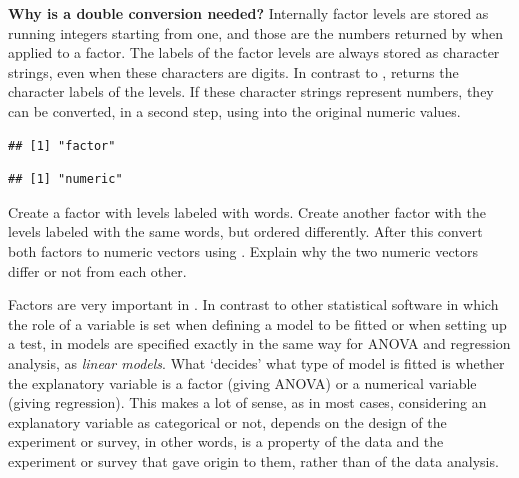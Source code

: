 \documentclass[krantz2]{krantz}\usepackage{knitr}%
\begin{document}
\begin{explainbox}
\textbf{Why is a double conversion needed?} Internally factor levels are stored as running integers starting from one, and those are the numbers returned by  when applied to a factor. The labels of the factor levels are always stored as character strings, even when these characters are digits. In contrast to ,  returns the character labels of the levels. If these character strings represent numbers, they can be converted, in a second step, using  into the original numeric values.

\begin{knitrout}\footnotesize
{}\color{fgcolor}\begin{kframe}
\begin{alltt}
\end{alltt}
\begin{verbatim}
## [1] "factor"
\end{verbatim}
\begin{alltt}
\end{alltt}
\begin{verbatim}
## [1] "numeric"
\end{verbatim}
\end{kframe}
\end{knitrout}
\end{explainbox}

\begin{playground}
Create a factor with levels labeled with words. Create another factor with the levels labeled with the same words, but ordered differently. After this convert both factors to numeric vectors using . Explain why the two numeric vectors differ or not from each other.
\end{playground}

Factors are very important in \Rlang. In contrast to other statistical software in which the role of a variable is set when defining a model to be fitted or when setting up a test, in \Rlang models are specified exactly in the same way for ANOVA and regression analysis, as \emph{linear models}. What `decides' what type of model is fitted is whether the explanatory variable is a factor (giving ANOVA) or a numerical variable (giving regression). This makes a lot of sense, as in most cases, considering an explanatory variable as categorical or not, depends on the design of the experiment or survey, in other words, is a property of the data and the experiment or survey that gave origin to them, rather than of the data analysis.
\end{document}
